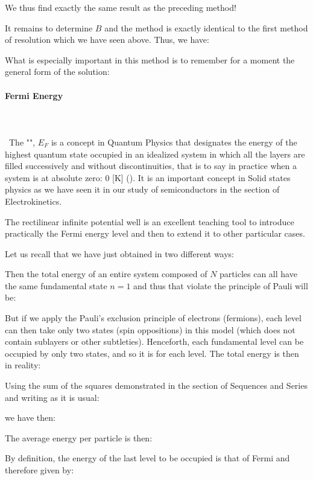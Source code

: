 	We thus find exactly the same result as the preceding method!

	It remains to determine $B$ and the method is exactly identical to the first method of resolution which we have seen above. Thus, we have:
	
	What is especially important in this method is to remember for a moment the general form of the solution:
	
	
	\pagebreak
	\paragraph{Fermi Energy}\mbox{}\\\\\
	The "\label{fermi energy}", $E_F$ is a concept in Quantum Physics that designates the energy of the highest quantum state occupied in an idealized system in which all the layers are filled successively and without discontinuities, that is to say in practice when a system is at absolute zero: $0$ [K] (). It is an important concept in Solid states physics as we have seen it in our study of semiconductors in the section of Electrokinetics.
	
	The rectilinear infinite potential well is an excellent teaching tool to introduce practically the Fermi energy level and then to extend it to other particular cases.

	Let us recall that we have just obtained in two different ways:
	
	Then the total energy of an entire system composed of $N$ particles can all have the same fundamental state $n = 1$ and thus that violate the principle of Pauli will be:
	
	But if we apply the Pauli's exclusion principle of electrons (fermions), each level can then take only two states (spin oppositions) in this model (which does not contain sublayers or other subtleties). Henceforth, each fundamental level can be occupied by only two states, and so it is for each level. The total energy is then in reality:
	
	Using the sum of the squares demonstrated in the section of Sequences and Series and writing as it is usual:
	
	we have then:
	
	The average energy per particle is then:
	
	By definition, the energy of the last level to be occupied is that of Fermi and therefore given by:
	
